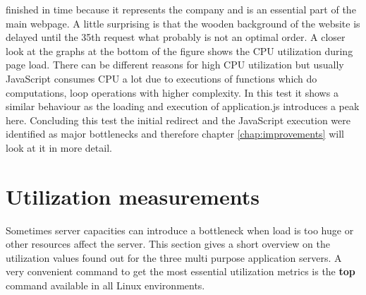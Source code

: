 finished in time because it represents the company and is an essential part of the main webpage. A little surprising is that the wooden background of the website is delayed until the 35th request what probably is not an optimal order. A closer look at the graphs at the bottom of the figure shows the CPU utilization during page load. There can be different reasons for high CPU utilization but usually JavaScript consumes CPU a lot due to executions of functions which do computations, loop operations with higher complexity. In this test it shows a similar behaviour as the loading and execution of application.js introduces a peak here. Concluding this test the initial redirect and the JavaScript execution were identified as major bottlenecks and therefore chapter \ref{chap:improvements} will look at it in more detail. 

\section{Utilization measurements}
Sometimes server capacities can introduce a bottleneck when load is too huge or other resources affect the server. This section gives a short overview on the utilization values found out for the three multi purpose application servers.  A very convenient command to get the most essential utilization metrics is the \textbf{top} command available in all Linux environments.

